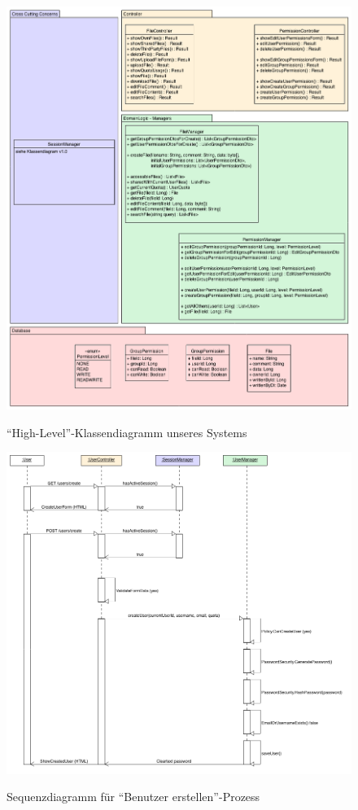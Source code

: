 \documentclass[12pt,DIV14,BCOR10mm,a4paper,parskip=half-,headsepline,headinclude,english,ngerman,bibliography=totocnumbered]{scrreprt}
\begin{document}
\begin{appendices}
\begin{figure}[!htb]
\hspace*{-2.5cm}
	\includegraphics[width=0.93\paperwidth]{resources/class_diagram_2.png}
	\label{architecture:class_diagram2}
	\caption{\enquote{High-Level}-Klassendiagramm unseres Systems}
\end{figure}

\begin{figure}[!htb]
	\hspace*{-1cm}
	\includegraphics[width=0.83\paperwidth]{resources/createuserseq_diagram.png}
	\label{architecture:createuserseq_diagram}
	\caption{Sequenzdiagramm für \enquote{Benutzer erstellen}-Prozess}
\end{figure}


\end{appendices}
\end{document}
